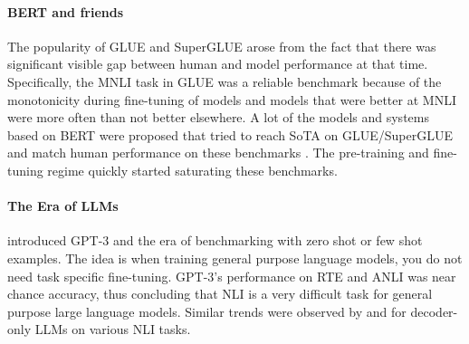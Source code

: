 \paragraph{BERT and friends} The popularity of GLUE \citep{wang2019glue} and SuperGLUE \citep{wang2019superglue} arose from the fact that there was significant visible gap between human and model performance at that time. Specifically, the MNLI task in GLUE was a reliable benchmark because of the monotonicity during fine-tuning of models and models that were better at MNLI were more often than not better elsewhere. A lot of the models and systems based on BERT \citep{devlin2019bert} were proposed that tried to reach SoTA on GLUE/SuperGLUE and match human performance on these benchmarks \citep{he2021deberta,he2021debertav3,patra2022englishcentric}. The pre-training and fine-tuning regime quickly started saturating these benchmarks.

\paragraph{The Era of LLMs} \citet{brown2020language} introduced GPT-3 and the era of benchmarking with zero shot or few shot examples. The idea is when training general purpose language models, you do not need task specific fine-tuning. GPT-3's performance on RTE and ANLI was near chance accuracy, thus concluding that NLI is a very difficult task for general purpose large language models. Similar trends were observed by \citet{ohmer2024form} and \citet{weber-etal-2023-mind} for decoder-only LLMs on various NLI tasks.

